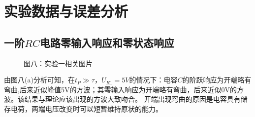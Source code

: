 \documentclass[a4paper]{article}
\begin{document}
    \vspace{1cm}


    \section{实验数据与误差分析}\label{sec:5}

    \subsection{一阶$RC$电路零输入响应和零状态响应}\label{subsec:$rc$7}
    \begin{figure}[htb]
        \centering
        \caption{\small 图八：实验一相关图片}
    \end{figure}

    {{由图八(a)分析可知，在$t_{P}\gg \tau$，$U_{R1}=5V$的情况下：电容$C$的阶跃响应为开端略有弯曲,后来近似峰值5V的方波；其零输入响应为开端略有弯曲，后来近似0V的方波。该结果与理论应该出现的方波大致吻合。 开端出现弯曲的原因是电容具有储存电荷，两端电压改变时可以短暂维持原状的能力。}}
\end{document}
